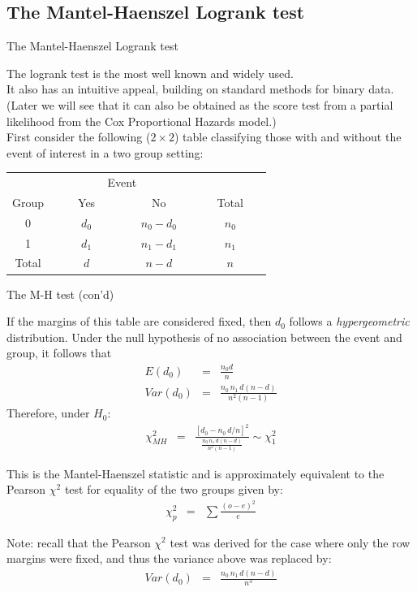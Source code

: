 \documentclass[envcountsect, 10pt, portrait, palatino]{beamer}
\begin{document}
\subsection{The Mantel-Haenszel Logrank test}
\begin{frame}{The Mantel-Haenszel Logrank test}

The logrank test is the most well known and widely used.
\\[2ex]
It also has an intuitive appeal, building on standard
methods for binary data.  (Later we will see that it
can also be obtained as the score test from a partial
likelihood from the Cox Proportional Hazards model.)
\\[2ex]
First consider the following ($2 \times 2$) table classifying those
with and without the event of interest in a two group setting:
\begin{center}
\begin{tabular}{cccc}
\hline \hline
& \multicolumn{2}{c}{Event} & \\ \cline{2-3}
\multicolumn{1}{c}{Group } & ~~~~Yes~~~~ & ~~~~No~~~~ & ~~~Total~~~\\ \hline
0 & $d_0$ & $n_0 - d_0$ & $n_0$  \\
1 & $d_1$ & $n_1 - d_1$ & $n_1$ \\
\hline
Total &  $d  $ & $n   - d  $ & $n  $  \\ \hline \hline
\end{tabular}
\end{center}
\end{frame}
\begin{frame}{The M-H test (con'd)}

If the margins of this table are considered fixed, then $d_0$
follows a {\em hypergeometric} distribution.  Under the null hypothesis of no association between
the event and group, it follows that
\begin{eqnarray*}
E(d_0) & = & \frac{n_0 d}{n}\\[2ex]
Var(d_0) & = & \frac{n_0 \, n_1 \, d(n-d)}{n^2 (n-1)}
\end{eqnarray*}
Therefore, under $H_0$:\\
\begin{eqnarray*}
\chi^2_{MH} & = & \frac{\left[d_0-n_0 \, d/n\right]^2}{\frac{n_0 \, n_1 \, d(n-d)}
{n^2 (n-1)}} \sim \chi^2_1
\end{eqnarray*}
\end{frame}
\begin{frame}
This is the Mantel-Haenszel statistic and is approximately
equivalent to the Pearson $\chi^2$ test for equality of the two
groups given by:
\begin{eqnarray*}
\chi^2_p & = & \sum \frac{(o-e)^2}{e}
\end{eqnarray*}

Note:  recall that the Pearson $\chi^2$ test was derived for the case where
only the row margins were fixed, and thus the variance above was replaced by:
\begin{eqnarray*}
Var(d_0) & = & \frac{n_0 \, n_1 \, d(n-d)}{n^3}
\end{eqnarray*}
\end{frame}
\end{document}
